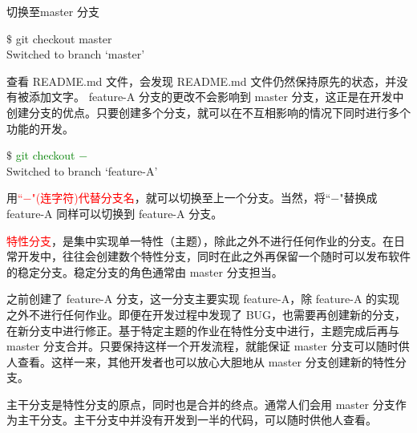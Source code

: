 \documentclass[12pt,a4paper]{article}
\begin{document}
切换至master 分支
\begin{tcolorbox}[colback=green!5,colframe=green!40!black,title= ]
$\$$ git checkout master \\
Switched to branch `master'
\end{tcolorbox}
查看 README.md 文件，会发现 README.md 文件仍然保持原先的状态，并没有被添加文字。 feature-A 分支的更改不会影响到 master 分支，这正是在开发中创建分支的优点。只要创建多个分支，就可以在不互相影响的情况下同时进行多个功能的开发。
\begin{tcolorbox}[colback=green!5,colframe=green!40!black,title= ]
$\$$ \textcolor{green}{git checkout $-$} \\
Switched to branch `feature-A'
\end{tcolorbox}
用\textcolor{red}{``$-$"(连字符)代替分支名}，就可以切换至上一个分支。当然，将``$-$"替换成 feature-A 同样可以切换到 feature-A 分支。

\textcolor{red}{特性分支}，是集中实现单一特性（主题），除此之外不进行任何作业的分支。在日常开发中，往往会创建数个特性分支，同时在此之外再保留一个随时可以发布软件的稳定分支。稳定分支的角色通常由 master 分支担当。

之前创建了 feature-A 分支，这一分支主要实现 feature-A，除 feature-A 的实现之外不进行任何作业。即便在开发过程中发现了 BUG，也需要再创建新的分支，在新分支中进行修正。基于特定主题的作业在特性分支中进行，主题完成后再与 master 分支合并。只要保持这样一个开发流程，就能保证 master 分支可以随时供人查看。这样一来，其他开发者也可以放心大胆地从 master 分支创建新的特性分支。


主干分支是特性分支的原点，同时也是合并的终点。通常人们会用 master 分支作为主干分支。主干分支中并没有开发到一半的代码，可以随时供他人查看。
\end{document}
